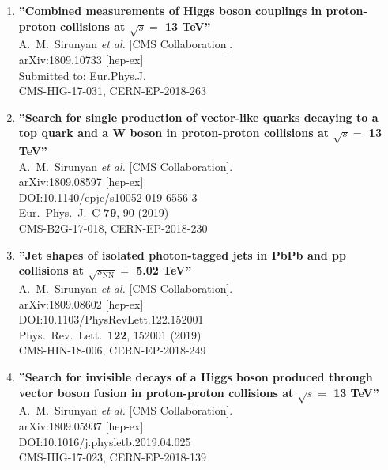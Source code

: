 \begin{enumerate}
\item%
{\bf ''Combined measurements of Higgs boson couplings in proton-proton collisions at $\sqrt{s}=$ 13 TeV''}
  \\{}A.~M.~Sirunyan {\it et al.} [CMS Collaboration].
  \\{}arXiv:1809.10733 [hep-ex]
  \\{}Submitted to: Eur.Phys.J.
  \\{}CMS-HIG-17-031, CERN-EP-2018-263

\item%
{\bf ''Search for single production of vector-like quarks decaying to a top quark and a W boson in proton-proton collisions at $\sqrt{s} =$ 13 TeV''}
  \\{}A.~M.~Sirunyan {\it et al.} [CMS Collaboration].
  \\{}arXiv:1809.08597 [hep-ex]
  \\{}DOI:10.1140/epjc/s10052-019-6556-3
  \\{}Eur.\ Phys.\ J.\ C {\bf 79}, 90 (2019)
  \\{}CMS-B2G-17-018, CERN-EP-2018-230

\item%
{\bf ''Jet shapes of isolated photon-tagged jets in PbPb and pp collisions at $\sqrt{s_\mathrm{NN}} =$ 5.02 TeV''}
  \\{}A.~M.~Sirunyan {\it et al.} [CMS Collaboration].
  \\{}arXiv:1809.08602 [hep-ex]
  \\{}DOI:10.1103/PhysRevLett.122.152001
  \\{}Phys.\ Rev.\ Lett.\  {\bf 122}, 152001 (2019)
  \\{}CMS-HIN-18-006, CERN-EP-2018-249

\item%
{\bf ''Search for invisible decays of a Higgs boson produced through vector boson fusion in proton-proton collisions at $\sqrt{s} =$ 13 TeV''}
  \\{}A.~M.~Sirunyan {\it et al.} [CMS Collaboration].
  \\{}arXiv:1809.05937 [hep-ex]
  \\{}DOI:10.1016/j.physletb.2019.04.025
  \\{}CMS-HIG-17-023, CERN-EP-2018-139


\end{enumerate}
